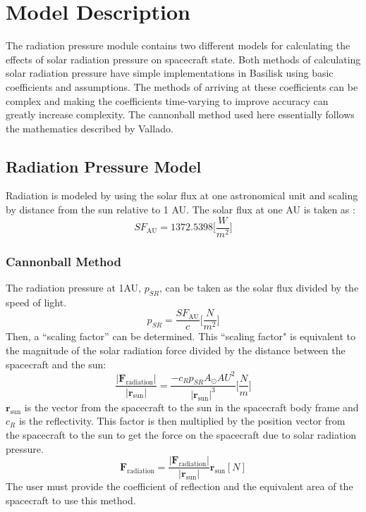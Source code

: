 \section{Model Description}
The radiation pressure module contains two different models for calculating the effects of solar radiation pressure on spacecraft state. Both methods of calculating solar radiation pressure have simple implementations in Basilisk using basic coefficients and assumptions. The methods of arriving at these coefficients can be complex and making the coefficients time-varying to improve accuracy can greatly increase complexity. The cannonball method used here essentially follows the mathematics described by Vallado\cite{vallado2001}.

\subsection{Radiation Pressure Model}
Radiation is modeled by using the solar flux at one astronomical unit and scaling by distance from the sun relative to 1 AU. The solar flux at one AU is taken as :
\begin{equation}
SF_{\mathrm{AU}} = 1372.5398    \bigg[\frac{W}{m^2}\bigg]
\end{equation}
\subsubsection{Cannonball Method}
The radiation pressure at 1AU, $p_{SR}$, can be taken as the solar flux divided by the speed of light. 
\begin{equation}
	p_{SR} = \frac{SF_{\mathrm{AU}}}{c} \bigg[\frac{N}{m^2}\bigg]
\end{equation}
Then, a ``scaling factor'' can be determined. This ``scaling factor" is equivalent to the magnitude of the solar radiation force divided by the distance between the spacecraft and the sun:
\begin{equation}
	\frac{|\mathbf{F}_{\textrm{radiation}}|}{|\mathbf{r}_{\textrm{sun}}|} = \frac{-c_{R}p_{SR}A_{\odot}{AU}^2}{|\mathbf{r}_{\textrm{sun}}|^3} \bigg[\frac{N}{m}\bigg]
\end{equation}
$\mathbf{r}_{\textrm{sun}}$ is the vector from the spacecraft to the sun in the spacecraft body frame and $c_R$ is the reflectivity. This factor is then multiplied by the position vector from the spacecraft to the sun to get the force on the spacecraft due to solar radiation pressure.
\begin{equation}
	{\mathbf{F}_{\textrm{radiation}}} = \frac{|\mathbf{F}_{\textrm{radiation}}|}{|\mathbf{r}_{\textrm{sun}}|}  \mathbf{r}_{\textrm{sun}} [N]
\end{equation}
The user must provide the coefficient of reflection and the equivalent area of the spacecraft to use this method.\\
